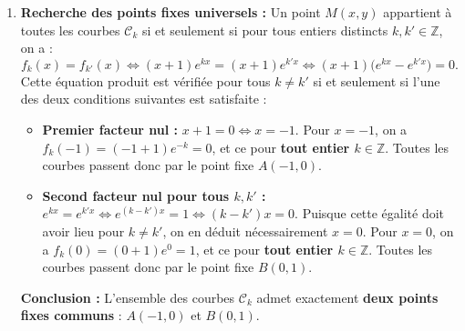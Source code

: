 \documentclass[11pt,a4paper]{article}
\newcommand{\Z}{\mathbb{Z}}
\begin{document}
\begin{correctionbox}[Exercice 8]
\begin{enumerate}[label=\textbf{\arabic*.}]
    \item \textbf{Recherche des points fixes universels :}
    Un point $M(x, y)$ appartient à toutes les courbes $\mathcal{C}_k$ si et seulement si pour tous entiers distincts $k, k' \in \Z$, on a :
    \[
    f_k(x) = f_{k'}(x) \iff (x + 1)e^{kx} = (x + 1)e^{k'x} \iff (x + 1)\bigl(e^{kx} - e^{k'x}\bigr) = 0.
    \]
    Cette équation produit est vérifiée pour tous $k \neq k'$ si et seulement si l'une des deux conditions suivantes est satisfaite :
    \begin{itemize}
        \item \textbf{Premier facteur nul :} $x + 1 = 0 \iff x = -1$.
        Pour $x = -1$, on a $f_k(-1) = (-1 + 1)e^{-k} = 0$, et ce pour \textbf{tout entier $k \in \Z$}.
        Toutes les courbes passent donc par le point fixe $\boxed{A(-1, 0)}$.
        \item \textbf{Second facteur nul pour tous $k, k'$ :} $e^{kx} = e^{k'x} \iff e^{(k - k')x} = 1 \iff (k - k')x = 0$.
        Puisque cette égalité doit avoir lieu pour $k \neq k'$, on en déduit nécessairement $x = 0$.
        Pour $x = 0$, on a $f_k(0) = (0 + 1)e^0 = 1$, et ce pour \textbf{tout entier $k \in \Z$}.
        Toutes les courbes passent donc par le point fixe $\boxed{B(0, 1)}$.
    \end{itemize}
    \textbf{Conclusion :} L'ensemble des courbes $\mathcal{C}_k$ admet exactement \textbf{deux points fixes communs} : $A(-1, 0)$ et $B(0, 1)$.


\end{enumerate}
\end{correctionbox}
\end{document}
